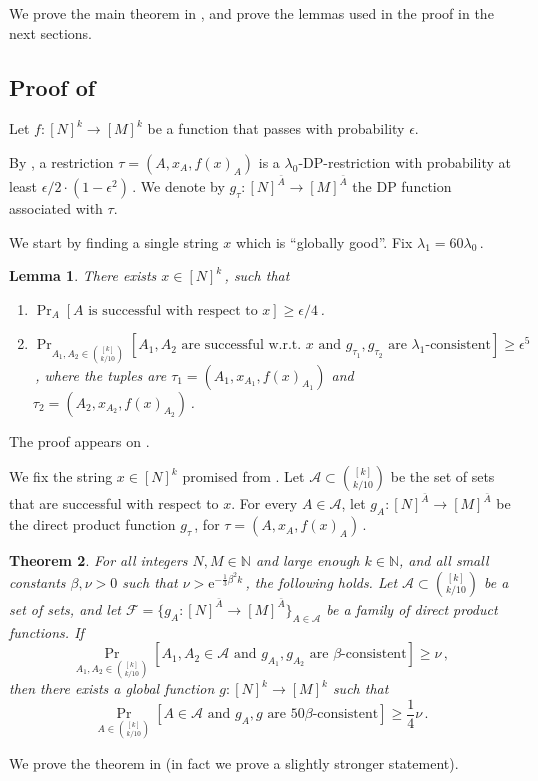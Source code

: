 \documentclass[11pt]{article}
\numberwithin{equation}{section}
\newtheorem{theorem}{Theorem}[section]
\newtheorem{lemma}[theorem]{Lemma}
\theoremstyle{definition}
\theoremstyle{plain}
\newcommand{\eee}{\mathrm e}
\newcommand{\Prob}[2][]{\Pr_{{#1}}\left[#2\right]} %
\newcommand{\set}[1]{\{#1\}} %
\newcommand\f{f} %
\newcommand{\g}{g} %
\newcommand\rest[1]{{\bar{#1}}}  %
\begin{document}
We prove the main theorem in , and prove the lemmas used in the proof in the next sections.
\subsection{Proof of }\label{sec:global proof}
Let $\f:[N]^k\rightarrow[M]^k$ be a function that passes  with probability $\epsilon$.

By , a restriction $\tau=(A,x_A,f(x)_A)$ is a $\lambda_0$-DP-restriction with probability at least  
%
$\epsilon/2 %
\cdot (1-\epsilon^2)$\,. We denote by $g_\tau:[N]^{\rest{A}}\to [M]^{\rest{A}}$ the DP function associated with $\tau$.

We start by finding a single string $x$ which is ``globally good''. Fix $\lambda_1 = 60\lambda_0$\,.
\begin{lemma} \label{lem:cons of local func}
	There exists $x\in[N]^k$\,, such that
	\begin{enumerate}
		\item $\Prob[A]{A \textrm{ is successful with respect to }x} \geq 
		\epsilon/4$\,. %
		\item $\Prob[A_1,A_2\in \binom{[k]}{k/10}]{A_1,A_2 \textrm{ are successful w.r.t. }x \textrm{ and }\g_{\tau_1},\g_{\tau_2} \text{ are } \lambda_1\textrm{-consistent}} \geq \epsilon^5$\,, where the tuples are $\tau_1=(A_1,x_{A_1},\f(x)_{A_1})$ and $\tau_2=(A_2,x_{A_2},\f(x)_{A_2})$\,.
	\end{enumerate}
\end{lemma}
The proof appears on . 

We fix the string $x\in[N]^k$ promised from .  Let $\mathcal{A}\subset \binom{[k]}{k/10}$ be the 
%
set %
of sets that are successful with respect to $x$.
For every $A\in\mathcal{A}$, let $\g_A:[N]^{\rest{A}}\rightarrow[M]^{\rest{A}}$ be the direct product function $\g_\tau$\,, for $\tau = (A,x_A,\f(x)_A)$\,.  

\begin{theorem}\label{thm:sets}
    For all integers $N,M\in\mathbb{N}$ and large enough $k\in\mathbb{N}$, and all small constants $\beta,\nu > 0$ such that $\nu > \eee^{-\frac{1}{3}\beta^2 k}$\,, the following holds.  Let $\mathcal{A}\subset\binom{[k]}{k/10} $ be a 
    set %
    of sets, and let $\mathcal{F}= \set{\g_A:[N]^{\rest{A}}\rightarrow[M]^{\rest{A}}}_{A\in\mathcal{A}}$ be a family of direct product functions. If
    \[ \Pr_{A_1,A_2\in \binom{[k]}{k/10}}[A_1,A_2\in\mathcal{A} \textrm{ and }\g_{A_1},\g_{A_2} \text{ are } \beta\textrm{-consistent}]\geq \nu\,, \] %
    then there exists a global function $\g:[N]^k\rightarrow [M]^k$ such that 
    \[ \Pr_{A\in\binom{[k]}{k/10}}[A\in\mathcal{A} \textrm{ and }\g_A,\g \text{ are } 50\beta \textrm{-consistent}] \geq \frac{1}{4}\nu\,. \]%
\end{theorem} 	
We prove the theorem in  (in fact we prove a slightly stronger statement).
\end{document}
